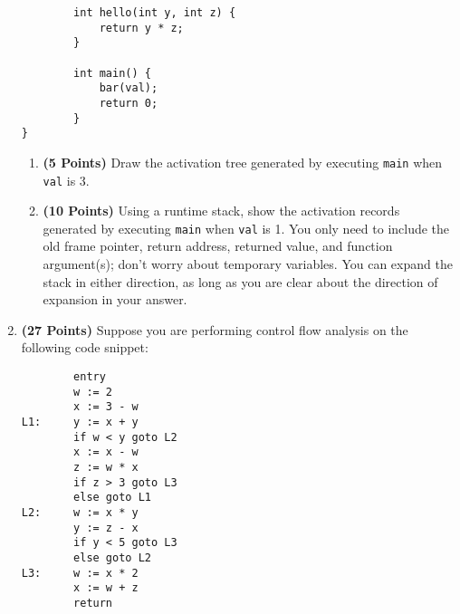 \documentclass{article}[12pt]
\begin{document}
\begin{enumerate}
\begin{lstlisting}
        int hello(int y, int z) {
            return y * z;
        }
        
        int main() {
            bar(val);
            return 0;
        }
}

\end{lstlisting}

    \begin{enumerate}
        \item \textbf{(5 Points)} Draw the activation tree generated by executing \texttt{main} when \texttt{val} is 3.
        \item \textbf{(10 Points)} Using a runtime stack, show the activation records generated by executing \texttt{main} when \texttt{val} is 1. You only need to include the old frame pointer, return address, returned value, and function argument(s); don't worry about temporary variables. You can expand the stack in either direction, as long as you are clear about the direction of expansion in your answer.
    \end{enumerate}
    \pagebreak
    
    \item \textbf{(27 Points)} Suppose you are performing control flow analysis on the following code snippet:
    
\begin{lstlisting}
        entry
        w := 2
        x := 3 - w
L1:     y := x + y
        if w < y goto L2
        x := x - w
        z := w * x
        if z > 3 goto L3
        else goto L1
L2:     w := x * y
        y := z - x
        if y < 5 goto L3
        else goto L2
L3:     w := x * 2
        x := w + z
        return
\end{lstlisting}
    

\end{enumerate}
\end{document}
